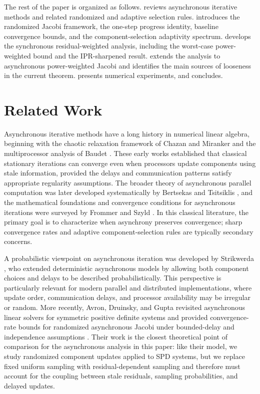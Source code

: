 \documentclass[pdflatex,sn-mathphys-num]{sn-jnl}%
\theoremstyle{thmstyleone}%
\theoremstyle{thmstyletwo}%
\theoremstyle{thmstylethree}%
\begin{document}
The rest of the paper is organized as follows.  
reviews asynchronous iterative methods and related randomized and adaptive
selection rules.   introduces the randomized Jacobi
framework, the one-step progress identity, baseline convergence bounds, and the
component-selection adaptivity spectrum.  
develops the synchronous residual-weighted analysis, including the worst-case
power-weighted bound and the IPR-sharpened result.   extends the
analysis to asynchronous power-weighted Jacobi and identifies the main sources
of looseness in the current theorem.   presents numerical
experiments, and  concludes.


\section{Related Work}
\label{sec:related-work}

Asynchronous iterative methods have a long history in numerical linear algebra,
beginning with the chaotic relaxation framework of Chazan and Miranker
\cite{chazan1969chaotic} and the multiprocessor analysis of Baudet
\cite{baudet1978asynchronous}.  These early works established that classical
stationary iterations can converge even when processors update components using
stale information, provided the delays and communication patterns satisfy
appropriate regularity assumptions.  The broader theory of asynchronous parallel
computation was later developed systematically by Bertsekas and Tsitsiklis
\cite{bertsekas1989parallel}, and the mathematical foundations and convergence
conditions for asynchronous iterations were surveyed by Frommer and Szyld
\cite{frommer2000asynchronous}.  In this classical literature, the primary goal
is to characterize when asynchrony preserves convergence; sharp convergence
rates and adaptive component-selection rules are typically secondary concerns.

A probabilistic viewpoint on asynchronous iteration was developed by Strikwerda
\cite{strikwerda2002probabilistic}, who extended deterministic asynchronous
models by allowing both component choices and delays to be described
probabilistically.  This perspective is particularly relevant for modern
parallel and distributed implementations, where update order, communication
delays, and processor availability may be irregular or random.  More recently,
Avron, Druinsky, and Gupta revisited asynchronous linear solvers for symmetric
positive definite systems and provided convergence-rate bounds for randomized
asynchronous Jacobi under bounded-delay and independence assumptions
\cite{avron2015revisiting}.  Their work is the closest theoretical point of
comparison for the asynchronous analysis in this paper: like their model, we
study randomized component updates applied to SPD systems, but we replace fixed
uniform sampling with residual-dependent sampling and therefore must account for
the coupling between stale residuals, sampling probabilities, and delayed
updates.
\end{document}
